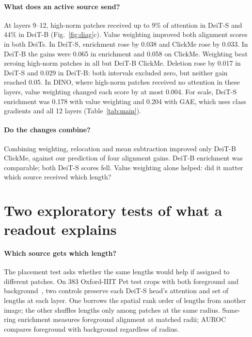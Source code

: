 \documentclass{article}
\begin{document}
\paragraph{What does an active source send?} At layers 9--12, high-norm patches received up to 9\% of attention in DeiT-S and 44\% in DeiT-B (Fig.~\ref{fig:diag}c). Value weighting improved both alignment scores in both DeiTs. In DeiT-S, enrichment rose by 0.038 and ClickMe rose by 0.033. In DeiT-B the gains were 0.065 in enrichment and 0.058 on ClickMe. Weighting beat zeroing high-norm patches in all but DeiT-B ClickMe. Deletion rose by 0.017 in DeiT-S and 0.029 in DeiT-B: both intervals excluded zero, but neither gain reached 0.05. In DINO, where high-norm patches received no attention in these layers, value weighting changed each score by at most 0.004. For scale, DeiT-S enrichment was 0.178 with value weighting and 0.204 with GAE, which uses class gradients and all 12 layers (Table~\ref{tab:main}).

\paragraph{Do the changes combine?} Combining weighting, relocation and mean subtraction improved only DeiT-B ClickMe, against our prediction of four alignment gains. DeiT-B enrichment was comparable; both DeiT-S scores fell. Value weighting alone helped: did it matter which source received which length?

\clearpage
\section{Two exploratory tests of what a readout explains}
\paragraph{Which source gets which length?} The placement test asks whether the same lengths would help if assigned to different patches. On 383 Oxford-IIIT Pet test crops with both foreground and background~\citep{parkhi2012pets}, two controls preserve each DeiT-S head's attention and set of lengths at each layer. One borrows the spatial rank order of lengths from another image; the other shuffles lengths only among patches at the same radius. Same-ring enrichment measures foreground alignment at matched radii; AUROC compares foreground with background regardless of radius.

\par\smallskip\noindent\begin{minipage}{\linewidth}

\label{tab:pets}\centering\small\setlength{\tabcolsep}{5pt}

\end{minipage}\par\smallskip
\end{document}
